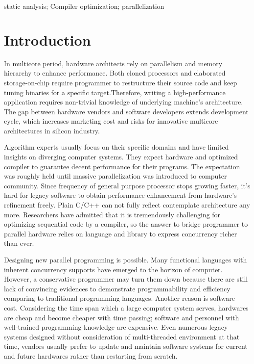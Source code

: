 \documentclass[10pt, conference, compsocconf]{IEEEtran}
\begin{document}
\begin{IEEEkeywords}
static analysis; Compiler optimization; parallelization
\end{IEEEkeywords}


%
\IEEEpeerreviewmaketitle

\section{Introduction}
In multicore period, hardware architects rely on parallelism and memory hierarchy to enhance performance. Both cloned processors and elaborated storage-on-chip require programmer to restructure their source code and keep tuning binaries for a specific target.Therefore, writing a high-performance application requires non-trivial knowledge of underlying machine's architecture. The gap between hardware vendors and software developers extends development cycle, which increases marketing cost and risks for innovative multicore architectures in silicon industry.

Algorithm experts usually focus on their specific domains and have limited insights on diverging computer systems. They expect hardware and optimized compiler to guarantee decent performance for their programs. The expectation was roughly held until massive parallelization was introduced to computer community. Since frequency of general purpose processor stops growing faster, it's hard for legacy software to obtain performance enhancement from hardware's refinement freely. Plain C/C++ can not fully reflect contemplate architecture any more. Researchers have admitted that it is tremendously challenging for optimizing sequential code by a compiler, so the answer to bridge programmer to parallel hardware relies on language and library to express concurrency richer than ever.

Designing new parallel programming is possible. Many functional languages \cite{13} with inherent concurrency supports have emerged to the horizon of computer. However, a conservative programmer may turn them down because there are still lack of convincing evidences to demonstrate programmability and efficiency comparing to traditional programming languages. Another reason is software cost. Considering the time span which a large computer system serves, hardwares are cheap and become cheaper with time passing; software and personnel with well-trained programming knowledge are expensive. Even numerous legacy systems designed without consideration of multi-threaded environment at that time, vendors usually prefer to update and maintain software systems for current and future hardwares rather than restarting from scratch. 
\end{document}
